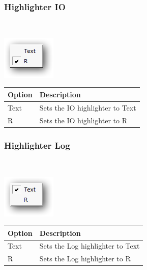 \hypertarget{menu_view_r_rterm_highlighter_IO}{}
\subsubsection{Highlighter IO}\\

\includegraphics[scale=0.50]{./res/menu_r_rterm_highlighter_io.png}\\

\begin{scriptsize}\begin{tabularx}{\textwidth}{>{\hsize=0.3\hsize}X>{\hsize=0.7\hsize}X}\\
    \hline
    \textbf{Option} & \textbf{Description} \\
    \hline
    Text & Sets the IO highlighter to Text \\
    R & Sets the IO highlighter to R \\
    \hline
  \end{tabularx}\end{scriptsize}


\hypertarget{menu_view_r_rterm_highlighter_Log}{}
\subsubsection{Highlighter Log}\\

\includegraphics[scale=0.50]{./res/menu_r_rterm_highlighter_log.png}\\

\begin{scriptsize}\begin{tabularx}{\textwidth}{>{\hsize=0.3\hsize}X>{\hsize=0.7\hsize}X}\\
    \hline
    \textbf{Option} & \textbf{Description} \\
    \hline
    Text & Sets the Log highlighter to Text \\
    R & Sets the Log highlighter to R \\
    \hline
  \end{tabularx}\end{scriptsize}


